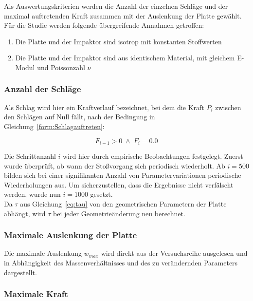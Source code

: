 Als Auswertungskriterien werden die Anzahl der einzelnen Schläge und der maximal auftretenden Kraft zusammen mit der Auslenkung der Platte gewählt. \\
Für die Studie werden folgende übergreifende Annahmen getroffen: 

\begin{enumerate}
	\item{Die Platte und der Impaktor sind isotrop mit konstanten Stoffwerten}
	\item{Die Platte und der Impaktor sind aus identischem Material, mit gleichem E-Modul und Poissonzahl $\nu$}
\end{enumerate}

\newpage
\subsubsection*{Anzahl der Schläge}

Als Schlag wird hier ein Kraftverlauf bezeichnet, bei dem die Kraft $P_{i}$ zwischen den Schlägen auf Null fällt, nach der Bedingung in Gleichung~\ref{form:Schlagauftreten}:

\begin{equation} 
	\label{form:Schlagauftreten}
	F_{i-1} > 0 \; \wedge \; F_{i} = 0.0 
\end{equation}

Die Schrittanzahl $i$ wird hier durch empirische Beobachtungen festgelegt. Zuerst wurde überprüft, ab wann der Stoßvorgang sich periodisch wiederholt. Ab $i = 500$ bilden sich bei einer signifikanten Anzahl von Parametervariationen periodische Wiederholungen aus. Um sicherzustellen, dass die Ergebnisse nicht verfälscht werden, wurde nun $i = 1000$ gesetzt.\\
Da $\tau$ aus Gleichung~\ref{eq:tau} von den geometrischen Parametern der Platte abhängt, wird $\tau$ bei jeder Geometrieänderung neu berechnet.


\subsubsection*{Maximale Auslenkung der Platte}

Die maximale Auslenkung $w_{max}$ wird direkt aus der Versuchsreihe ausgelesen und in Abhängigkeit des Massenverhältnisses und des zu verändernden Parameters dargestellt.

\subsubsection*{Maximale Kraft}

